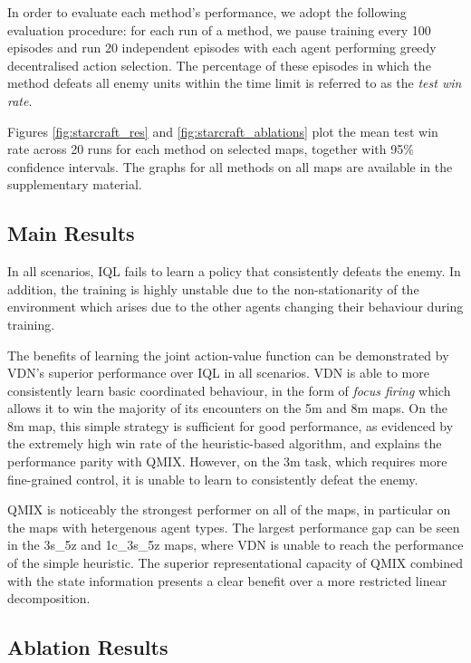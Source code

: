 \documentclass{article}
\begin{document}
In order to evaluate each method's performance, we adopt the following evaluation procedure: for each run of a method, we pause training every 100 episodes and run 20 independent episodes with each agent performing greedy decentralised action selection. The percentage of these episodes in which the method defeats all enemy units within the time limit is referred to as the \emph{test win rate}. 

Figures \ref{fig:starcraft_res} and \ref{fig:starcraft_ablations} plot the mean test win rate across 20 runs for each method on selected maps, together with 95$\%$ confidence intervals. The graphs for all methods on all maps are available in the supplementary material.

\subsection{Main Results}
In all scenarios, IQL fails to learn a policy that consistently defeats the enemy. In addition, the training is highly unstable due to the non-stationarity of the environment which arises due to the other agents changing their behaviour during training. 

The benefits of learning the joint action-value function can be demonstrated by VDN's superior performance over IQL in all scenarios. VDN is able to more consistently learn basic coordinated behaviour, in the form of \textit{focus firing} which allows it to win the majority of its encounters on the 5m and 8m maps. On the 8m map, this simple strategy is sufficient for good performance, as evidenced by the extremely high win rate of the heuristic-based algorithm, and explains the performance parity with QMIX. However, on the 3m task, which requires more fine-grained control, it is unable to learn to consistently defeat the enemy.

QMIX is noticeably the strongest performer on all of the maps, in particular on the maps with hetergenous agent types. The largest performance gap can be seen in the 3s\_5z and 1c\_3s\_5z maps, where VDN is unable to reach the performance of the simple heuristic. The superior representational capacity of QMIX combined with the state information presents a clear benefit over a more restricted linear decomposition. 

\subsection{Ablation Results}
\end{document}
